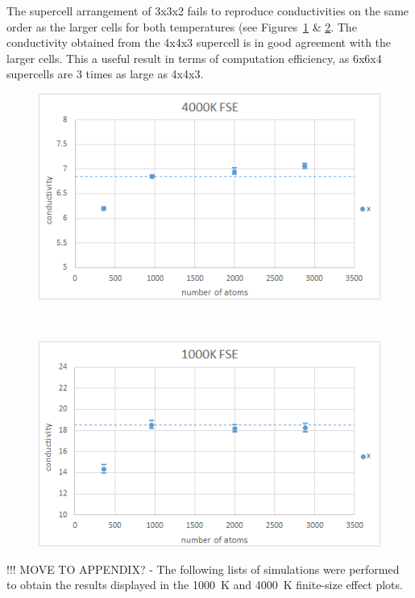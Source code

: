 The supercell arrangement of 3x3x2 fails to reproduce conductivities on the same order as the larger cells for both temperatures (see Figures~\ref{fig:gk_fse_4K} \& \ref{fig:gk_fse_1K}. The conductivity obtained from the 4x4x3 supercell is in good agreement with the larger cells. This a useful result in terms of computation efficiency, as 6x6x4 supercells are 3 times as large as 4x4x3.

\begin{figure}[]
\includegraphics[width=\linewidth]{Figures/gk_fse_4K_draft.png}
\caption[gk fse 4k]{}
\label{fig:gk_fse_4K}
\end{figure}
~
\begin{figure}[]
\includegraphics[width=\linewidth]{Figures/gk_fse_1K_draft.png}
\caption[gk fse 1k]{}
\label{fig:gk_fse_1K}
\end{figure}


%
\pagebreak
%


!!! MOVE TO APPENDIX? - The following lists of simulations were performed to obtain the results displayed in the 1000~K and 4000~K finite-size effect plots.


